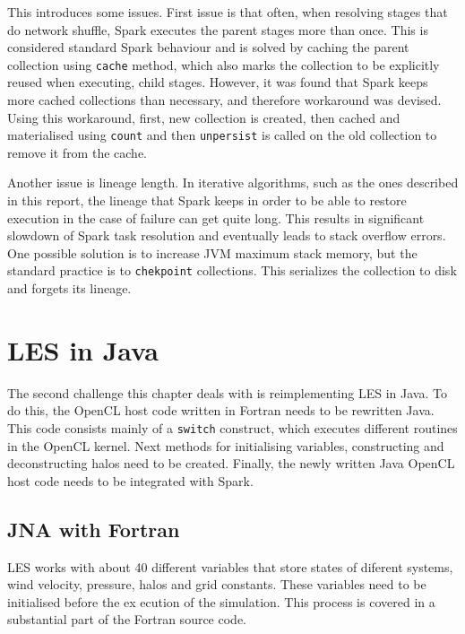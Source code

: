 \documentclass{l4proj}
\begin{document}
This introduces some issues. First issue is that often, when resolving stages that
do network shuffle, Spark executes the parent stages more than once. This is
considered standard Spark behaviour and is solved by caching the parent collection
using \texttt{cache} method, which also marks the collection to be explicitly reused
when executing, child stages. However, it was found that Spark keeps more cached collections
than necessary, and therefore workaround was devised. Using this workaround, first,
new collection is created, then cached and materialised using \texttt{count} and 
then \texttt{unpersist} is called on the old collection to remove it from the cache.

Another issue is lineage length. In iterative algorithms, such as the ones described 
in this report, the lineage that Spark keeps in order to be able to restore execution
in the case of failure can get quite long. This results in significant slowdown of
Spark task resolution and eventually leads to stack overflow errors. One possible
solution is to increase JVM maximum stack memory, but the standard practice is to
\texttt{chekpoint} collections. This serializes the collection to disk and forgets
its lineage.

\chapter{LES in Java}
\label{chap:les_java}

The second challenge this chapter deals with is reimplementing LES in Java.
To do this, the OpenCL host code written in Fortran needs to be rewritten 
Java. This code consists mainly of a \texttt{switch} construct, which executes
different routines in the OpenCL kernel. Next methods for initialising variables,
constructing and deconstructing halos need to be created. Finally, the newly 
written Java OpenCL host code needs to be integrated with Spark.

\section{JNA with Fortran}

LES works with about 40 different variables that store states of diferent systems,
wind velocity, pressure, halos and grid constants. These variables need to be initialised
before the ex ecution of the simulation. This process is covered in a substantial part of
the Fortran source code.
\end{document}
